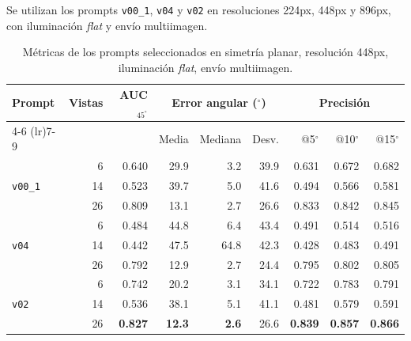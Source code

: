 Se utilizan los prompts \texttt{v00\_1}, \texttt{v04} y \texttt{v02} en resoluciones 224px, 448px y 896px, con iluminación \textit{flat} y envío multiimagen.

\begin{table}[H]
\centering
\caption{Métricas de los prompts seleccionados en simetría planar, resolución 448px, iluminación \textit{flat}, envío multiimagen.}
\label{tab:nov_plane_448}
\footnotesize
\setlength{\tabcolsep}{3pt}
\renewcommand{\arraystretch}{0.95}

\begin{tabular*}{\textwidth}{@{\extracolsep{\fill}}lrrrrrrrr@{}}
\toprule
\multirow{2}{*}{Prompt} & \multirow{2}{*}{Vistas} & \multirow{2}{*}{AUC$_{45^\circ}$} & \multicolumn{3}{c}{Error angular ($^\circ$)} & \multicolumn{3}{c}{Precisión} \\
\cmidrule(lr){4-6} \cmidrule(lr){7-9}
 &  &  & Media & Mediana & Desv. & @5$^\circ$ & @10$^\circ$ & @15$^\circ$ \\
\midrule
\multirow{3}{*}{\texttt{v00\_1}} & 6 & 0.640 & 29.9 & 3.2 & 39.9 & 0.631 & 0.672 & 0.682 \\
 & 14 & 0.523 & 39.7 & 5.0 & 41.6 & 0.494 & 0.566 & 0.581 \\
 & 26 & 0.809 & 13.1 & 2.7 & 26.6 & 0.833 & 0.842 & 0.845 \\
\midrule
\multirow{3}{*}{\texttt{v04}} & 6 & 0.484 & 44.8 & 6.4 & 43.4 & 0.491 & 0.514 & 0.516 \\
 & 14 & 0.442 & 47.5 & 64.8 & 42.3 & 0.428 & 0.483 & 0.491 \\
 & 26 & 0.792 & 12.9 & 2.7 & 24.4 & 0.795 & 0.802 & 0.805 \\
\midrule
\multirow{3}{*}{\texttt{v02}} & 6 & 0.742 & 20.2 & 3.1 & 34.1 & 0.722 & 0.783 & 0.791 \\
 & 14 & 0.536 & 38.1 & 5.1 & 41.1 & 0.481 & 0.579 & 0.591 \\
 & 26 & \textbf{0.827} & \textbf{12.3} & \textbf{2.6} & 26.6 & \textbf{0.839} & \textbf{0.857} & \textbf{0.866} \\
\bottomrule
\end{tabular*}

\vspace{2ex}


\end{table}
